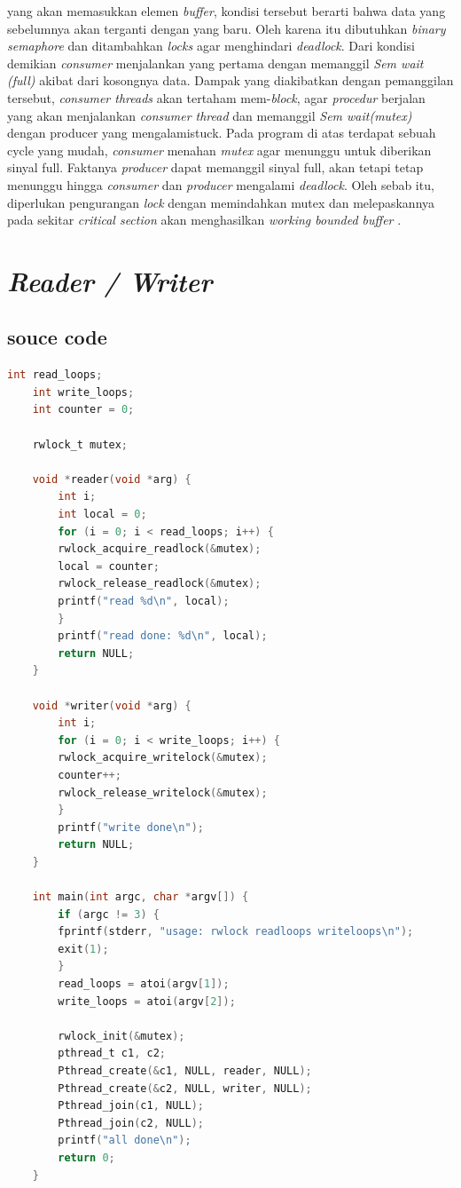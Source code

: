 \documentclass[11pt,a4paper]{article}
\begin{document}
yang akan memasukkan elemen \textit{buffer}, kondisi tersebut berarti bahwa data yang sebelumnya akan terganti dengan yang baru. Oleh karena itu dibutuhkan \textit{binary semaphore} dan ditambahkan \textit{locks} agar menghindari \textit{deadlock}. Dari kondisi demikian \textit{consumer} menjalankan yang pertama dengan memanggil \textit{Sem wait (full)} akibat dari kosongnya data. Dampak yang diakibatkan dengan pemanggilan tersebut, \textit{consumer threads} akan tertaham mem-\textit{block}, agar \textit{procedur} berjalan yang akan menjalankan \textit{consumer thread}  dan memanggil \textit{Sem wait(mutex)} dengan producer yang mengalamistuck. Pada program di atas terdapat sebuah cycle yang mudah, \textit{consumer} menahan \textit{mutex} agar menunggu untuk diberikan sinyal full. Faktanya  \textit{producer} dapat memanggil sinyal full, akan tetapi tetap menunggu hingga \textit{consumer} dan \textit{producer} mengalami \textit{deadlock}. Oleh sebab itu, diperlukan pengurangan \textit{lock} dengan memindahkan mutex dan melepaskannya pada sekitar \textit{critical section} akan menghasilkan \textit{working bounded buffer} .

\section{\textit{Reader / Writer}}
\subsection{souce code}
\begin{lstlisting}[language = C]		
	int read_loops;
	int write_loops;
	int counter = 0;

	rwlock_t mutex;

	void *reader(void *arg) {
		int i;
		int local = 0;
		for (i = 0; i < read_loops; i++) {
		rwlock_acquire_readlock(&mutex);
		local = counter;
		rwlock_release_readlock(&mutex);
		printf("read %d\n", local);
		}
		printf("read done: %d\n", local);
		return NULL;
	}

	void *writer(void *arg) {
		int i;
		for (i = 0; i < write_loops; i++) {
		rwlock_acquire_writelock(&mutex);
		counter++;
		rwlock_release_writelock(&mutex);
		}
		printf("write done\n");
		return NULL;
	}

	int main(int argc, char *argv[]) {
		if (argc != 3) {
		fprintf(stderr, "usage: rwlock readloops writeloops\n");
		exit(1);
		}
		read_loops = atoi(argv[1]);
		write_loops = atoi(argv[2]);
		
		rwlock_init(&mutex); 
		pthread_t c1, c2;
		Pthread_create(&c1, NULL, reader, NULL);
		Pthread_create(&c2, NULL, writer, NULL);
		Pthread_join(c1, NULL);
		Pthread_join(c2, NULL);
		printf("all done\n");
		return 0;
	}
\end{lstlisting}
\end{document}
